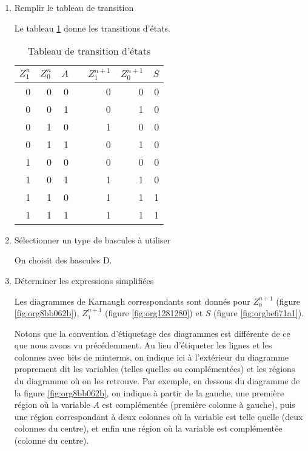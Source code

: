 \documentclass[11pt]{article}
\begin{document}
\begin{enumerate}
\item Remplir le tableau de transition
\label{sec:orgbd48228}

Le tableau \ref{tab:org449ec26} donne les transitions d'états. 

\begin{table}[htbp]
\caption{\label{tab:org449ec26}Tableau de transition d'états}
\centering
\begin{tabular}{rrrlrrr}
\(Z_1^n\) & \(Z_0^n\) & \(A\) &  & \(Z_1^{n+1}\) & \(Z_0^{n+1}\) & \(S\)\\[0pt]
\hline
0 & 0 & 0 &  & 0 & 0 & 0\\[0pt]
0 & 0 & 1 &  & 0 & 1 & 0\\[0pt]
0 & 1 & 0 &  & 1 & 0 & 0\\[0pt]
0 & 1 & 1 &  & 0 & 1 & 0\\[0pt]
1 & 0 & 0 &  & 0 & 0 & 0\\[0pt]
1 & 0 & 1 &  & 1 & 1 & 0\\[0pt]
1 & 1 & 0 &  & 1 & 1 & 1\\[0pt]
1 & 1 & 1 &  & 1 & 1 & 1\\[0pt]
\end{tabular}
\end{table}


\item Sélectionner un type de bascules à utiliser
\label{sec:org858f112}

On choisit des bascules D. 

\item Déterminer les expressions simplifiées
\label{sec:orgc7e6449}

Les diagrammes de Karnaugh correspondants sont donnés pour
\(Z_0^{n+1}\) (figure \ref{fig:org8bb062b}), \(Z_1^{n+1}\) (figure
\ref{fig:org1281280}) et \(S\) (figure \ref{fig:orgbe671a1}).  

Notons que la convention d'étiquetage des diagrammes est différente de
ce que nous avons vu précédemment.  Au lieu d'étiqueter les lignes et
les colonnes avec bits de minterms, on indique ici à l'extérieur du
diagramme proprement dit les variables (telles quelles ou
complémentées) et les régions du diagramme où on les retrouve. Par
exemple, en dessous du diagramme de la figure \ref{fig:org8bb062b}, on
indique à partir de la gauche, une première région où la variable
\(A\) est complémentée (première colonne à gauche), puis une région
correspondant à deux colonnes où la variable est telle quelle (deux
colonnes du centre), et enfin une région où la variable est
complémentée (colonne du centre).


\end{enumerate}
\end{document}
